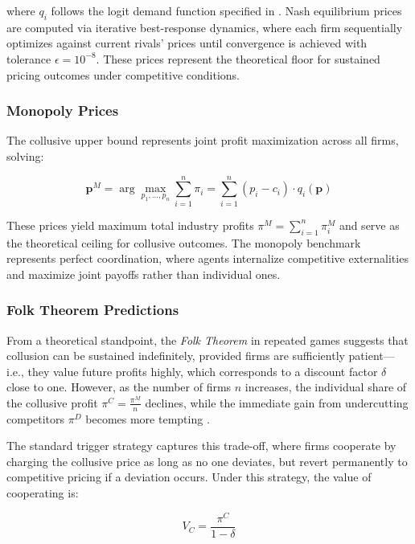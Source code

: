 where $q_i$ follows the logit demand function specified in . Nash equilibrium prices are computed via iterative best-response dynamics, where each firm sequentially optimizes against current rivals' prices until convergence is achieved with tolerance $\epsilon = 10^{-8}$. These prices represent the theoretical floor for sustained pricing outcomes under competitive conditions.

\subsubsection*{Monopoly Prices}

The collusive upper bound represents joint profit maximization across all firms, solving:

\begin{equation}
    \mathbf{p}^M = \arg\max_{p_1,...,p_n} \sum_{i=1}^n \pi_i = \sum_{i=1}^n (p_i - c_i) \cdot q_i(\mathbf{p})
\end{equation}

These prices yield maximum total industry profits $\pi^M = \sum_{i=1}^n \pi_i^M$ and serve as the theoretical ceiling for collusive outcomes. The monopoly benchmark represents perfect coordination, where agents internalize competitive externalities and maximize joint payoffs rather than individual ones.

\subsubsection*{Folk Theorem Predictions}

From a theoretical standpoint, the \emph{Folk Theorem} in repeated games suggests that collusion can be sustained indefinitely, provided firms are sufficiently patient---i.e., they value future profits highly, which corresponds to a discount factor $\delta$ close to one. However, as the number of firms $n$ increases, the individual share of the collusive profit $\pi^C = \frac{\pi^M}{n}$ declines, while the immediate gain from undercutting competitors $\pi^D$ becomes more tempting \parencite{ivaldi_chapter_2007, tirole_theory_1988}.

The standard trigger strategy captures this trade-off, where firms cooperate by charging the collusive price as long as no one deviates, but revert permanently to competitive pricing if a deviation occurs. Under this strategy, the value of cooperating is:

\begin{equation}
    V_C = \frac{\pi^C}{1 - \delta}
\end{equation}

